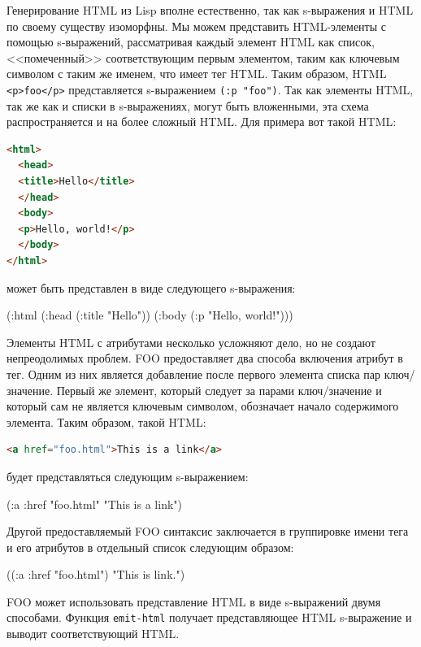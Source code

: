 Генерирование HTML из Lisp вполне естественно, так как s-выражения и HTML по своему
существу изоморфны. Мы можем представить HTML-элементы с помощью s-выражений, рассматривая
каждый элемент HTML как список, <<помеченный>> соответствующим первым элементом, таким как
ключевым символом с таким же именем, что имеет тег HTML. Таким образом, HTML
\lstinline!<p>foo</p>! представляется s-выражением \lstinline{(:p "foo")}. Так как элементы
HTML, так же как и списки в s-выражениях, могут быть вложенными, эта схема распространяется
и на более сложный HTML. Для примера вот такой HTML:

\begin{lstlisting}[language=HTML]
<html>
  <head>
  <title>Hello</title>
  </head>
  <body>
  <p>Hello, world!</p>
  </body>
</html>
\end{lstlisting}

\noindent{}может быть представлен в виде следующего s-выражения:

\begin{myverb}
(:html
  (:head (:title "Hello"))
  (:body (:p "Hello, world!")))
\end{myverb}

Элементы HTML с атрибутами несколько усложняют дело, но не создают непреодолимых
проблем. FOO предоставляет два способа включения атрибут в тег. Одним из них
является добавление после первого элемента списка пар ключ/значение. Первый же элемент,
который следует за парами ключ/значение и который сам не является ключевым символом,
обозначает начало содержимого элемента. Таким образом, такой HTML:

\begin{lstlisting}[language=HTML]
<a href="foo.html">This is a link</a>
\end{lstlisting}

\noindent{}будет представляться следующим s-выражением:

\begin{myverb}
(:a :href "foo.html" "This is a link")
\end{myverb}

Другой предоставляемый FOO синтаксис заключается в группировке имени тега и его
атрибутов в отдельный список следующим образом:

\begin{myverb}
((:a :href "foo.html") "This is link.")
\end{myverb}

FOO может использовать представление HTML в виде s-выражений двумя
способами. Функция \lstinline{emit-html} получает представляющее HTML s-выражение и выводит
соответствующий HTML.

